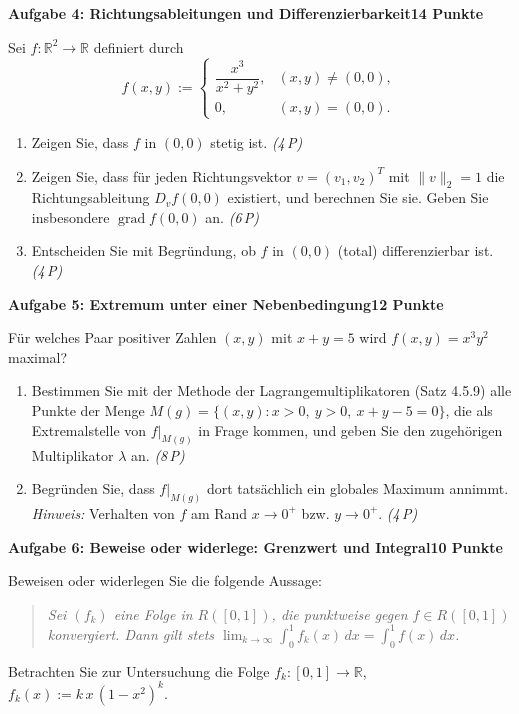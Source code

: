 \documentclass[a4paper,12pt]{article}
\newcommand{\pkt}[1]{\hfill\textit{(#1\,P)}}
\newcommand{\aufgabe}[3]{%
  \bigskip\par\noindent\textbf{Aufgabe #1: #2}\hfill\textbf{#3 Punkte}%
  \par\nobreak\medskip}
\begin{document}
\aufgabe{4}{Richtungsableitungen und Differenzierbarkeit}{14}

Sei $f:\mathbb{R}^2\to\mathbb{R}$ definiert durch
\[
f(x,y):=\begin{cases}\dfrac{x^3}{x^2+y^2},&(x,y)\neq(0,0),\\[1ex]0,&(x,y)=(0,0).\end{cases}
\]
\begin{enumerate}[label=\alph*)]
  \item Zeigen Sie, dass $f$ in $(0,0)$ stetig ist. \pkt{4}
  \item Zeigen Sie, dass für jeden Richtungsvektor $v=(v_1,v_2)^{T}$ mit $\|v\|_2=1$ die Richtungsableitung $D_v f(0,0)$ existiert, und berechnen Sie sie. Geben Sie insbesondere $\operatorname{grad} f(0,0)$ an. \pkt{6}
  \item Entscheiden Sie mit Begründung, ob $f$ in $(0,0)$ (total) differenzierbar ist. \pkt{4}
\end{enumerate}

\aufgabe{5}{Extremum unter einer Nebenbedingung}{12}

Für welches Paar positiver Zahlen $(x,y)$ mit $x+y=5$ wird $f(x,y)=x^3y^2$ maximal?
\begin{enumerate}[label=\alph*)]
  \item Bestimmen Sie mit der Methode der Lagrangemultiplikatoren (Satz 4.5.9) alle Punkte der Menge $M(g)=\{(x,y): x>0,\ y>0,\ x+y-5=0\}$, die als Extremalstelle von $f|_{M(g)}$ in Frage kommen, und geben Sie den zugehörigen Multiplikator $\lambda$ an. \pkt{8}
  \item Begründen Sie, dass $f|_{M(g)}$ dort tatsächlich ein globales Maximum annimmt. \emph{Hinweis:} Verhalten von $f$ am \glqq Rand\grqq{} $x\to0^+$ bzw. $y\to0^+$. \pkt{4}
\end{enumerate}

\aufgabe{6}{Beweise oder widerlege: Grenzwert und Integral}{10}

Beweisen oder widerlegen Sie die folgende Aussage:
\begin{quote}
\itshape Sei $(f_k)$ eine Folge in $R([0,1])$, die punktweise gegen $f\in R([0,1])$ konvergiert. Dann gilt stets $\displaystyle\lim_{k\to\infty}\int_0^1 f_k(x)\,dx=\int_0^1 f(x)\,dx$.
\end{quote}
Betrachten Sie zur Untersuchung die Folge $f_k:[0,1]\to\mathbb{R}$, $f_k(x):=k\,x\,(1-x^2)^k$.
\end{document}
